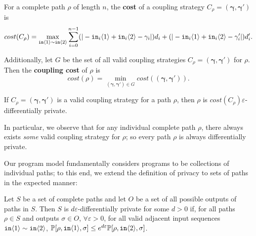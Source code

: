 \begin{defn}
    For a complete path $\rho$ of length $n$, the \textbf{cost} of a coupling strategy $C_\rho=(\bm{\gamma}, \bm{\gamma}')$ is \[cost(C_\rho) = \max_{\texttt{in}\langle1 \rangle\sim\texttt{in}\langle2 \rangle}\sum_{i=0}^{n-1}(|-\texttt{in}_i\langle1 \rangle+\texttt{in}_i\langle2 \rangle-\gamma_i|)d_i+(|-\texttt{in}_i\langle1 \rangle+\texttt{in}_i\langle2 \rangle-\gamma_i'|)d_i'.\]

    Additionally, let $G$ be the set of all valid coupling strategies $C_\rho=(\bm{\gamma}, \bm{\gamma}')$ for $\rho$. Then the \textbf{coupling cost} of $\rho$ is 
    \[cost(\rho) = \min_{(\bm{\gamma}, \bm{\gamma}')\in G}cost((\bm{\gamma}, \bm{\gamma}')).\]
\end{defn}

\begin{cor}
    If $C_\rho=(\bm{\gamma}, \bm{\gamma}')$ is a valid coupling strategy for a path $\rho$, then $\rho$ is $cost(C_\rho)\varepsilon$-differentially private.
\end{cor}

In particular, we observe that for any individual complete path $\rho$, there always exists \textit{some} valid coupling strategy for $\rho$; so every path $\rho$ is always differentially private. 

Our program model fundamentally considers programs to be collections of individual paths; to this end, we extend the definition of privacy to sets of paths in the expected manner:

\begin{defn}
  Let $S$ be a set of complete paths and let $O$ be a set of all possible outputs of paths in $S$. 
  Then $S$ is $d\varepsilon$-differentially private for some $d>0$ if, for all paths $\rho\in S$ and outputs $\sigma\in O$, $\forall \varepsilon>0$, for all valid adjacent input sequences $\texttt{in}\langle1 \rangle\sim \texttt{in}\langle2 \rangle$, $\mathbb{P}[\rho, \texttt{in}\langle1 \rangle, \sigma]\leq e^{d\varepsilon}\mathbb{P}[\rho, \texttt{in}\langle2 \rangle, \sigma]$.
\end{defn}



